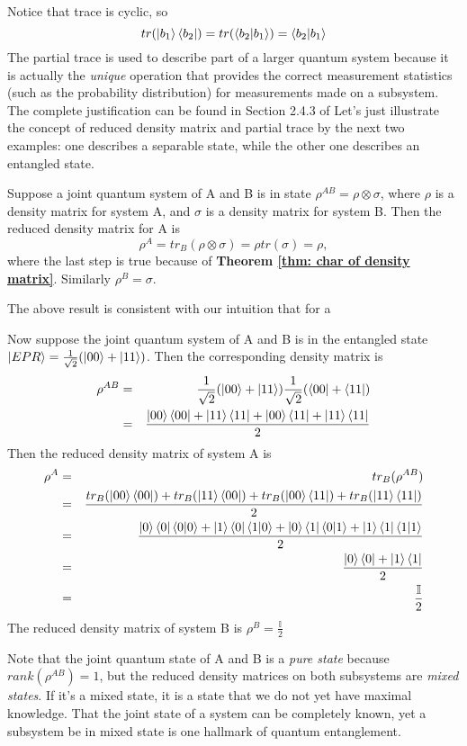 {\color{green}
Notice that trace is cyclic, so
\begin{equation}
 tr(\ket{b_1}\bra{b_2})=tr(\braket{b_2|b_1})=\braket{b_2|b_1}
\end{equation}
The partial trace is used to describe part of a larger quantum system because it is actually the \emph{unique} operation that provides the correct measurement statistics (such as the probability distribution) for measurements made on a subsystem. The complete justification can be found in Section 2.4.3 of \cite{Nielsen} 
Let's just illustrate the concept of reduced density matrix and partial trace by the next two examples: one describes a separable state, while the other one describes an entangled state.
\begin{example}
Suppose a joint quantum system of A and B is in state $\rho^{AB}=\rho \otimes \sigma$, where $\rho$ is a density matrix for system A, and $\sigma$ is a density matrix for system B. Then the reduced density matrix for A is
\begin{equation}
    \rho^A=tr_B (\rho \otimes \sigma)=\rho tr(\sigma)=\rho,
\end{equation}
where the last step is true because of \textbf{Theorem \ref{thm: char of density matrix}}.
Similarly $\rho^B=\sigma$.
\end{example}
The above result is consistent with our intuition that for a 
\begin{example}
Now suppose the joint quantum system of A and B is in the entangled state $\ket{EPR}=\frac{1}{\sqrt{2}}(\ket{00}+\ket{11})$. Then the corresponding density matrix is
\begin{eqnarray}
\rho^{AB}&=&\frac{1}{\sqrt{2}}(\ket{00}+\ket{11})\frac{1}{\sqrt{2}}(\bra{00}+\bra{11})\\
&=& \frac{\ket{00}\bra{00}+\ket{11}\bra{11}+\ket{00}\bra{11}+\ket{11}\bra{11}}{2}
\end{eqnarray}
Then the reduced density matrix of system A is 
\begin{eqnarray}
\rho^A&=&tr_B(\rho^{AB})\\
&=&\frac{tr_B(\ket{00}\bra{00})+tr_B(\ket{11}\bra{00})+tr_B(\ket{00}\bra{11})+tr_B(\ket{11}\bra{11})}{2}\\
&=&\frac{\ket{0}\bra{0}\braket{0|0}+\ket{1}\bra{0}\braket{1|0}+\ket{0}\bra{1}\braket{0|1}+\ket{1}\bra{1}\braket{1|1}}{2}\\
&=&\frac{\ket{0}\bra{0}+\ket{1}\bra{1}}{2}\\
&=&\frac{\mathbb{I}}{2}
\end{eqnarray}
The reduced density matrix of system B is $\rho^B=\frac{\mathbb{I}}{2}$
\end{example}
Note that the joint quantum state of A and B is a \emph{pure state} because $rank(\rho^{AB})=1$, but the reduced density matrices on both subsystems are \emph{mixed states}. If it's a mixed state, it is a state that we do not yet have maximal knowledge. That the joint state of a system can be completely known, yet a subsystem be in mixed state is one hallmark of quantum entanglement.
}